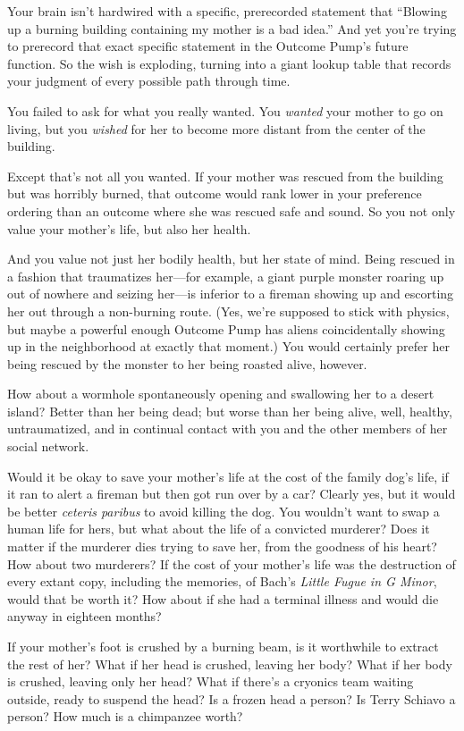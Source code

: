 {
 Your brain isn't hardwired with a specific,
prerecorded statement that ``Blowing up a burning
building containing my mother is a bad idea.'' And
yet you're trying to prerecord that exact specific
statement in the Outcome Pump's future function. So the
wish is exploding, turning into a giant lookup table that records your
judgment of every possible path through time.}

{
 You failed to ask for what you really wanted. You \textit{wanted}
your mother to go on living, but you \textit{wished} for her to become
more distant from the center of the building.}

{
 Except that's not all you wanted. If your mother
was rescued from the building but was horribly burned, that outcome
would rank lower in your preference ordering than an outcome where she
was rescued safe and sound. So you not only value your
mother's life, but also her health.}

{
 And you value not just her bodily health, but her state of mind.
Being rescued in a fashion that traumatizes her---for example, a giant
purple monster roaring up out of nowhere and seizing her---is inferior
to a fireman showing up and escorting her out through a non-burning
route. (Yes, we're supposed to stick with physics, but
maybe a powerful enough Outcome Pump has aliens coincidentally showing
up in the neighborhood at exactly that moment.) You would certainly
prefer her being rescued by the monster to her being roasted alive,
however.}

{
 How about a wormhole spontaneously opening and swallowing her to a
desert island? Better than her being dead; but worse than her being
alive, well, healthy, untraumatized, and in continual contact with you
and the other members of her social network.}

{
 Would it be okay to save your mother's life at the
cost of the family dog's life, if it ran to alert a
fireman but then got run over by a car? Clearly yes, but it would be
better \textit{ceteris paribus} to avoid killing the dog. You
wouldn't want to swap a human life for hers, but what
about the life of a convicted murderer? Does it matter if the murderer
dies trying to save her, from the goodness of his heart? How about two
murderers? If the cost of your mother's life was the
destruction of every extant copy, including the memories, of
Bach's \textit{Little Fugue in G Minor}, would that be
worth it? How about if she had a terminal illness and would die anyway
in eighteen months?}

{
 If your mother's foot is crushed by a burning
beam, is it worthwhile to extract the rest of her? What if her head is
crushed, leaving her body? What if her body is crushed, leaving only
her head? What if there's a cryonics team waiting
outside, ready to suspend the head? Is a frozen head a person? Is Terry
Schiavo a person? How much is a chimpanzee worth?}

